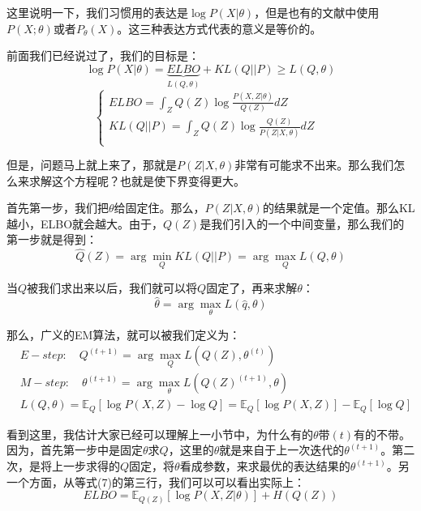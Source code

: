 \documentclass[a4paper]{article}
\begin{document}
这里说明一下，我们习惯用的表达是$\log P(X|\theta)$，但是也有的文献中使用$P(X;\theta)$或者$P_\theta(X)$。这三种表达方式代表的意义是等价的。

前面我们已经说过了，我们的目标是：
\begin{equation}
    \log P(X|\theta) = \underbrace{ELBO}_{L(Q,\theta)} + KL(Q||P) \geq L(Q,\theta)
\end{equation}
\begin{equation}
    \left\{
    \begin{array}{ll}
      ELBO = \int_Z Q(Z)\log \frac{P(X,Z|\theta)}{Q(Z)} dZ & \\
      KL(Q||P) = \int_Z Q(Z)\log \frac{Q(Z)}{P(Z|X,\theta)} dZ & \\
    \end{array}
    \right.
\end{equation}

但是，问题马上就上来了，那就是$P(Z|X,\theta)$非常有可能求不出来。那么我们怎么来求解这个方程呢？也就是使下界变得更大。

首先第一步，我们把$\theta$给固定住。那么，$P(Z|X,\theta)$的结果就是一个定值。那么KL越小，ELBO就会越大。由于，$Q(Z)$是我们引入的一个中间变量，那么我们的第一步就是得到：
\begin{equation}
    \hat{Q}(Z) = \arg\min_{Q} KL(Q||P) = \arg\max_Q L(Q,\theta)
\end{equation}

当$Q$被我们求出来以后，我们就可以将$Q$固定了，再来求解$\theta$：
\begin{equation}
    \hat{\theta} = \arg\max_{\theta} L(\hat{q},\theta)
\end{equation}

那么，广义的EM算法，就可以被我们定义为：
\begin{equation}
    \begin{split}
        & E-step:\quad Q^{(t+1)} = \arg\max_{Q} L(Q(Z),\theta^{(t)}) \\
        & M-step:\quad \theta^{(t+1)} = \arg\max_{\theta} L(Q(Z)^{(t+1)},\theta) \\
        & L(Q,\theta) = \mathbb{E}_Q\left[ \log P(X,Z) - \log Q\right]
        = \mathbb{E}_Q\left[ \log P(X,Z) \right] - \mathbb{E}_Q\left[\log Q \right]
    \end{split}
\end{equation}

看到这里，我估计大家已经可以理解上一小节中，为什么有的$\theta$带$(t)$有的不带。因为，首先第一步中是固定$\theta$求$Q$，这里的$\theta$就是来自于上一次迭代的$\theta^{(t+1)}$。第二次，是将上一步求得的$Q$固定，将$\theta$看成参数，来求最优的表达结果的$\theta^{(t+1)}$。另一个方面，从等式(7)的第三行，我们可以可以看出实际上：
\begin{equation}
    ELBO = \mathbb{E}_{Q(Z)}[\log P(X,Z|\theta)] + H(Q(Z))
\end{equation}
\end{document}
